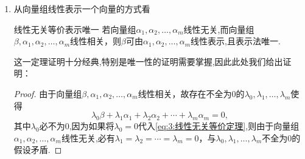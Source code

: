 \begin{enumerate}
\begin{proof}
              \[
                  \lambda_1 \alpha_{i_1} + \lambda_2 \alpha_{i_2} + \cdots + \lambda_k \alpha_{i_k} = 0,
              \]

              则将上式扩充为

              \[
                  \lambda_1 \alpha_{i_1} + \lambda_2 \alpha_{i_2} + \cdots + \lambda_k \alpha_{i_k}  + 0 \alpha_{i_{k+1}} + \cdots + 0 \alpha_{i_n} = 0,
              \]
              其中 $\lambda_{k+1} = \lambda_{k+2} = \cdots = \lambda_n = 0$, 且 $\lambda_1,\lambda_2,\ldots,\lambda_k$ 不全为零，（即将不在子集中的其它元素以$0$作为系数加到方程中，这样就找到了一个满足线性相关定义的式子）这与 $\{ \alpha_1,\alpha_2,\ldots,\alpha_n \}$ 线性无关矛盾. 故 $\{ \alpha_{i_1},\alpha_{i_2},\ldots,\alpha_{i_k} \}$ 线性无关.

              相同的方法证明后者，设 $\{ \alpha_1,\alpha_2,\ldots,\alpha_n \}$ 线性相关，则存在不全为零的 $\lambda_1,\lambda_2,\ldots,\lambda_n$ 使得

              \[
                  \lambda_1 \alpha_1 + \lambda_2 \alpha_2 + \cdots + \lambda_n \alpha_n = 0,
              \]

              则对于任意包含它的向量组,我们也可以将多出来的向量系数取$0$,这样就找到了一个满足线性相关定义的式子,因此包含它的向量组也线性相关.
          \end{proof}
          如果向量组的一个部分组线性相关，那么整个向量组也线性相关；

          如果向量组线性无关，那么它的任何一个部分组也线性无关.

    \item 从向量组线性表示一个向量的方式看
          \begin{theorem}{}{线性无关等价表示唯一}
              若向量组$\alpha_1,\alpha_2,\ldots,\alpha_m$线性无关,而向量组$\beta,\alpha_1,\alpha_2,\ldots,\alpha_m$线性相关，则$\beta$可由$\alpha_1,\alpha_2,\ldots,\alpha_m$线性表示,且表示法唯一.
          \end{theorem}
          这一定理证明十分经典,特别是唯一性的证明需要掌握,因此此处我们给出证明：

          \begin{proof}
              由于向量组$\beta,\alpha_1,\alpha_2,\ldots,\alpha_m$线性相关，故存在不全为0的$\lambda_0,\lambda_1,\ldots,\lambda_m$使得
              \begin{equation}\label{eq:3:线性无关等价定理}
                  \lambda_0\beta+\lambda_1\alpha_1+\lambda_2\alpha_2+\cdots+\lambda_m\alpha_m=0,
              \end{equation}
              其中$\lambda_0$必不为0,因为如果将$\lambda_0=0$代入\autoref{eq:3:线性无关等价定理},则由于向量组$\alpha_1,\alpha_2,\ldots,\alpha_m$线性无关,必有$\lambda_1=\lambda_2=\cdots=\lambda_m=0$，与$\lambda_0,\lambda_1,\ldots,\lambda_m$不全为0的假设矛盾.


\end{proof}
\end{enumerate}
